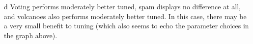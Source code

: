 \documentclass[fleqn]{homework}
\begin{document}
\begin{problem}{d}
    Voting performs moderately better tuned, spam displays no difference at all,
    and volcanoes also performs moderately better tuned.  In this case, there
    may be a very small benefit to tuning (which also seems to echo the
    parameter choices in the graph above).
  \end{problem}
\end{document}
